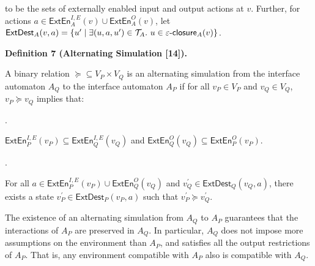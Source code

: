 to be the sets of externally enabled input and output actions at $v$. Further, for actions $a\in\mathsf{ExtEn}^{I,E}_{A}(v)\cup\mathsf{ExtEn}^{O}_{A}(v)$, let $\mathsf{ExtDest}_{A}(v,a)=\{u^{\prime}\mid\exists(u,a,u^{\prime})\in\mathcal{T}_{A}.\nobreak\ u\in\varepsilon\text{-}\mathsf{closure}_{A}(v)\}$.\par
 
 
 
\par\medskip\noindent\textbf{Definition 7 (Alternating Simulation [14]).}\par
 
 
A binary relation $\succeq\subseteq V_{P}\times V_{Q}$ is an alternating simulation from the interface automaton $A_{Q}$ to the interface automaton $A_{P}$ if for all $v_{P}\in V_{P}$ and $v_{Q}\in V_{Q}$, $v_{P}\succeq v_{Q}$ implies that:\par
  
\par{}. 
 
$\mathsf{ExtEn}^{I,E}_{P}(v_{P})\subseteq\mathsf{ExtEn}^{I,E}_{Q}(v_{Q})$ and $\mathsf{ExtEn}^{O}_{Q}(v_{Q})\subseteq\mathsf{ExtEn}^{O}_{P}(v_{P})$.\par
 
 
 
\par{}. 
 
For all $a\in\mathsf{ExtEn}^{I,E}_{P}(v_{P})\cup\mathsf{ExtEn}^{O}_{Q}(v_{Q})$ and $v_{Q}^{\prime}\in\mathsf{ExtDest}_{Q}(v_{Q},a)$, there exists a state $v_{P}^{\prime}\in\mathsf{ExtDest}_{P}(v_{P},a)$ such that $v_{P}^{\prime}\succeq v_{Q}^{\prime}$.\par
 
 
  
 
 
 
The existence of an alternating simulation from $A_{Q}$ to $A_{P}$ guarantees that the interactions of $A_{P}$ are preserved in $A_{Q}$. In particular, $A_{Q}$ does not impose more assumptions on the environment than $A_{P}$, and satisfies all the output restrictions of $A_{P}$. That is, any environment compatible with $A_{P}$ also is compatible with $A_{Q}$.\par
 
